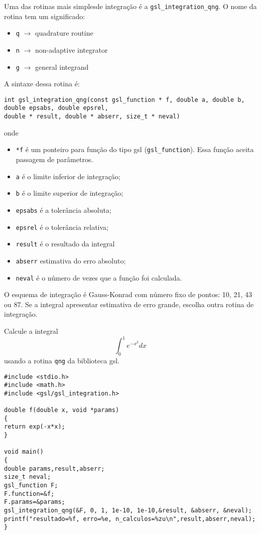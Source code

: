 Uma das rotinas mais simplesde integração é a \verb|gsl_integration_qng|. O nome da rotina tem um significado:
\begin{itemize}
 \item \verb|q| $\rightarrow$ quadrature routine
 \item \verb|n| $\rightarrow$ non-adaptive integrator
 \item \verb|g| $\rightarrow$ general integrand
\end{itemize}
A sintaxe dessa rotina é:
\begin{verbatim}
int gsl_integration_qng(const gsl_function * f, double a, double b, double epsabs, double epsrel,
double * result, double * abserr, size_t * neval)
\end{verbatim}
onde
\begin{itemize}
\item \verb|*f| é um ponteiro para função do tipo gsl (\verb|gsl_function|). Essa função aceita passagem de parâmetros.
 \item \verb|a| é o limite inferior de integração;
  \item \verb|b| é o limite superior de integração;
 \item \verb|epsabs| é a tolerância absoluta;
 \item \verb|epsrel| é o tolerância relativa;
 \item \verb|result| é o resultado da integral
 \item \verb|abserr| estimativa do erro absoluto;
 \item \verb|neval| é o número de vezes que a função foi calculada.
\end{itemize}
O esquema de integração é Gauss-Konrad com número fixo de pontos: 10, 21, 43 ou 87. Se a integral apresentar estimativa de erro grande, escolha outra rotina de integração.
\begin{ex}
Calcule a integral
$$
\int_0^1 e^{-x^2}dx
$$
usando a rotina \verb|qng| da biblioteca gsl.
\end{ex}
\begin{verbatim}
#include <stdio.h>
#include <math.h>
#include <gsl/gsl_integration.h>

double f(double x, void *params)
{
return exp(-x*x);
}

void main()
{
double params,result,abserr;
size_t neval;
gsl_function F;
F.function=&f;
F.params=&params;
gsl_integration_qng(&F, 0, 1, 1e-10, 1e-10,&result, &abserr, &neval);
printf("resultado=%f, erro=%e, n_calculos=%zu\n",result,abserr,neval);
}
\end{verbatim}
